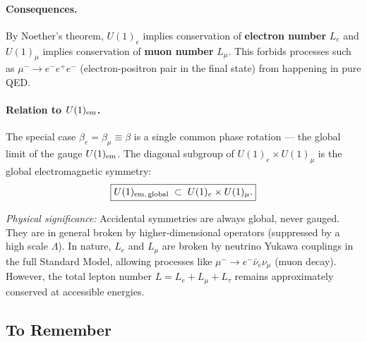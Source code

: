 \documentclass[../main.tex]{subfiles}
\begin{document}
\paragraph{Consequences.}
By Noether's theorem, $U(1)_e$ implies conservation of \textbf{electron number} $L_e$ and $U(1)_\mu$ implies conservation of \textbf{muon number} $L_\mu$.  This forbids processes such as $\mu^-\to e^-e^+e^-$ (electron-positron pair in the final state) from happening in pure QED.

\paragraph{Relation to $U(1)_{\rm em}$.}
The special case $\beta_e=\beta_\mu\equiv\beta$ is a single common phase rotation — the global limit of the gauge $U(1)_{\rm em}$.  The diagonal subgroup of $U(1)_e\times U(1)_\mu$ is the global electromagnetic symmetry:
\begin{equation}
  \boxed{
  U(1)_{\rm em,\,global} \;\subset\; U(1)_e\times U(1)_\mu.}
  \label{eq:lec11:symmetry-chain}
\end{equation}

\textit{Physical significance:}  Accidental symmetries are always global, never gauged.  They are in general broken by higher-dimensional operators (suppressed by a high scale $\Lambda$).  In nature, $L_e$ and $L_\mu$ are broken by neutrino Yukawa couplings in the full Standard Model, allowing processes like $\mu^-\to e^-\bar\nu_e\nu_\mu$ (muon decay).  However, the total lepton number $L=L_e+L_\mu+L_\tau$ remains approximately conserved at accessible energies.

\subsection*{To Remember}
\end{document}
